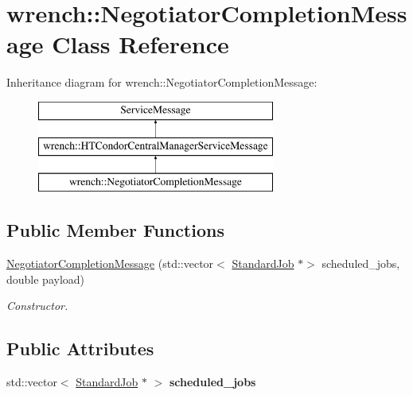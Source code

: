\hypertarget{classwrench_1_1_negotiator_completion_message}{}\section{wrench\+:\+:Negotiator\+Completion\+Message Class Reference}
\label{classwrench_1_1_negotiator_completion_message}
Inheritance diagram for wrench\+:\+:Negotiator\+Completion\+Message\+:\begin{figure}[H]
\begin{center}
\leavevmode
\includegraphics[height=3.000000cm]{classwrench_1_1_negotiator_completion_message}
\end{center}
\end{figure}
\subsection*{Public Member Functions}
\begin{DoxyCompactItemize}
\item 
\hyperlink{classwrench_1_1_negotiator_completion_message_aece506a0df6a8a5bf7484467f05c9b19}{Negotiator\+Completion\+Message} (std\+::vector$<$ \hyperlink{classwrench_1_1_standard_job}{Standard\+Job} $\ast$$>$ scheduled\+\_\+jobs, double payload)
\begin{DoxyCompactList}\small\item\em Constructor. \end{DoxyCompactList}\end{DoxyCompactItemize}
\subsection*{Public Attributes}
\begin{DoxyCompactItemize}
\item 
\mbox{\label{classwrench_1_1_negotiator_completion_message_aeaf67aaa5ac0bc830eff59ef6d51d9d5}} 
std\+::vector$<$ \hyperlink{classwrench_1_1_standard_job}{Standard\+Job} $\ast$ $>$ {\bfseries scheduled\+\_\+jobs}
\end{DoxyCompactItemize}
